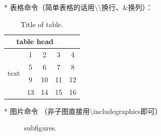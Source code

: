\documentclass[11pt,a4paper]{article}
\begin{document}
* 表格命令（简单表格的话用$\setminus \setminus$换行、$\&$换列）：	
\begin{table}[!htbp]
	\caption{Title of table.} \label{tab:table}
	\centering
	\addtolength{\tabcolsep}{-0mm} %
	\begin{tabular}{ccccc}
		\toprule[0.75pt]	%
		\multicolumn{4}{c}{table head} \\
		\midrule[0.5pt]	%
		\multirow{4}{*}{text} & 1 & 2 & 3 & 4 \\  %
		& 5 & 6 & 7 & 8 \\
		\cmidrule[0.5pt]{2-4}	%
		& 9 & 10 & 11 & 12 \\
		& 13 & 14 & 15 & 16 \\
		\bottomrule[0.75pt]	%
	\end{tabular}
\end{table}

* 图片命令 （非子图直接用$\setminus$includegraphics即可）
\begin{figure}[htbp]
	\centering
	\hspace{30pt}
	\hspace{30pt}
	\caption{subfigures.}
	\label{fig:subfigures}
\end{figure}
\end{document}
